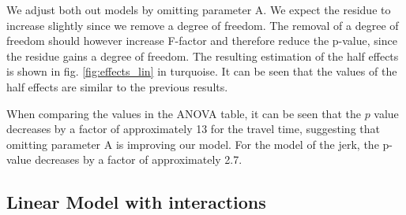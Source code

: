 
We adjust both out models by omitting parameter A. We expect the residue to increase slightly since we remove a degree of freedom. The removal of a degree of freedom should however increase F-factor and therefore reduce the p-value, since the residue gains a degree of freedom. The resulting estimation of the half effects is shown in fig. \ref{fig:effects_lin} in turquoise. It can be seen that the values of the half effects are similar to the previous results.

When comparing the values in the ANOVA table, it can be seen that the $p$ value decreases by a factor of approximately 13 for the travel time, suggesting that omitting parameter A is improving our model. For the model of the jerk, the p-value decreases by a factor of approximately 2.7.


\subsection{Linear Model with interactions}

